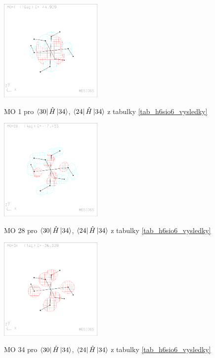 \documentclass[
  digital, %
  table,   %
  lof,     %
  lot,     %
]{fithesis3}
\begin{document}
  \begin{figure}[h]
\caption{MO 1 pro $\bra{30}{\hat{H}}\ket{34}$, $\bra{24}{\hat{H}}\ket{34}$  z tabulky \ref{tab_h6sio6_vysledky}}
  \center
  \includegraphics[width=5cm]{h6sio6_obrazky/s1_1.eps}
  \label{obr_h6sio6_MO_s1_1}
  \end{figure}
 
 \begin{figure}[h]
\caption{MO 28 pro $\bra{30}{\hat{H}}\ket{34}$, $\bra{24}{\hat{H}}\ket{34}$  z tabulky \ref{tab_h6sio6_vysledky}}
  \center
  \includegraphics[width=5cm]{h6sio6_obrazky/s1_28.eps}
  \label{obr_h6sio6_MO_s1_28}
  \end{figure}

\begin{figure}[h]
\caption{MO 34 pro $\bra{30}{\hat{H}}\ket{34}$, $\bra{24}{\hat{H}}\ket{34}$  z tabulky \ref{tab_h6sio6_vysledky}}
  \center
  \includegraphics[width=5cm]{h6sio6_obrazky/s1_34.eps}
  \label{obr_h6sio6_MO_s1_34}
  \end{figure}
  
\end{document}
